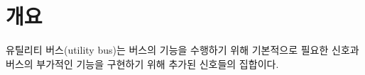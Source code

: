 \section{개요}
유틸리티 버스(utility bus)는 버스의 기능을 수행하기 위해 기본적으로
필요한 신호과 버스의 부가적인 기능을 구현하기 위해 추가된 신호들의 집합이다.
%

%
